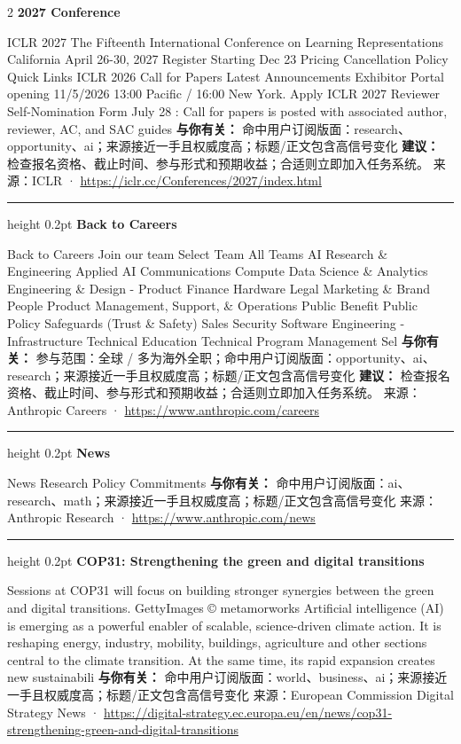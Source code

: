 \documentclass[10.5pt]{ctexart}
\begin{document}
\begin{multicols}{2}
{\large\bfseries 2027 Conference}\par
ICLR 2027 The Fifteenth International Conference on Learning Representations California April 26-30, 2027 Register Starting Dec 23 Pricing Cancellation Policy Quick Links ICLR 2026 Call for Papers Latest Announcements Exhibitor Portal opening 11/5/2026 13:00 Pacific / 16:00 New York. Apply ICLR 2027 Reviewer Self-Nomination Form July 28 : Call for papers is posted with associated author, reviewer, AC, and SAC guides 
\textbf{与你有关：} 命中用户订阅版面：research、opportunity、ai；来源接近一手且权威度高；标题/正文包含高信号变化
\textbf{建议：} 检查报名资格、截止时间、参与形式和预期收益；合适则立即加入任务系统。
{\footnotesize\color{ormuted} 来源：ICLR · \url{https://iclr.cc/Conferences/2027/index.html}}
\vspace{2mm}
\hrule height 0.2pt
\vspace{2mm}
{\large\bfseries Back to Careers}\par
Back to Careers Join our team Select Team All Teams AI Research \& Engineering Applied AI Communications Compute Data Science \& Analytics Engineering \& Design - Product Finance Hardware Legal Marketing \& Brand People Product Management, Support, \& Operations Public Benefit Public Policy Safeguards (Trust \& Safety) Sales Security Software Engineering - Infrastructure Technical Education Technical Program Management Sel
\textbf{与你有关：} 参与范围：全球 / 多为海外全职；命中用户订阅版面：opportunity、ai、research；来源接近一手且权威度高；标题/正文包含高信号变化
\textbf{建议：} 检查报名资格、截止时间、参与形式和预期收益；合适则立即加入任务系统。
{\footnotesize\color{ormuted} 来源：Anthropic Careers · \url{https://www.anthropic.com/careers}}
\vspace{2mm}
\hrule height 0.2pt
\vspace{2mm}
{\large\bfseries News}\par
News Research Policy Commitments
\textbf{与你有关：} 命中用户订阅版面：ai、research、math；来源接近一手且权威度高；标题/正文包含高信号变化
{\footnotesize\color{ormuted} 来源：Anthropic Research · \url{https://www.anthropic.com/news}}
\vspace{2mm}
\hrule height 0.2pt
\vspace{2mm}
{\large\bfseries COP31: Strengthening the green and digital transitions}\par
Sessions at COP31 will focus on building stronger synergies between the green and digital transitions. GettyImages © metamorworks Artificial intelligence (AI) is emerging as a powerful enabler of scalable, science-driven climate action. It is reshaping energy, industry, mobility, buildings, agriculture and other sections central to the climate transition. At the same time, its rapid expansion creates new sustainabili
\textbf{与你有关：} 命中用户订阅版面：world、business、ai；来源接近一手且权威度高；标题/正文包含高信号变化
{\footnotesize\color{ormuted} 来源：European Commission Digital Strategy News · \url{https://digital-strategy.ec.europa.eu/en/news/cop31-strengthening-green-and-digital-transitions}}
\end{multicols}
\end{document}
